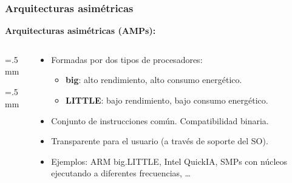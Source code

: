 \documentclass[10pt]{beamer}
\begin{document}
\begin{frame} %
  \frametitle{Arquitecturas asimétricas}
  
  {\bf Arquitecturas asimétricas (AMPs):}
  \vspace{1cm}
  \begin{columns}[onlytextwidth]
    \begin{column}{0.2\textwidth}
      \centering
      \fboxsep=2.5mm \fboxrule=.5mm
      
      
      
      
      \fboxsep=1.5mm \fboxrule=.5mm
      
      
      
    \end{column}
    
    \begin{column}{0.8\textwidth}    
      \begin{itemize}
        \small
      \item Formadas por dos tipos de procesadores:
        \begin{itemize}
          \small
        \item {\bf big}: alto rendimiento, alto consumo energético.
        \item {\bf LITTLE}: bajo rendimiento, bajo consumo energético.
        \end{itemize}
        
      \item Conjunto de instrucciones común. Compatibilidad binaria.  
      \item Transparente para el usuario (a través de soporte del SO).
      \item Ejemplos: ARM big.LITTLE, Intel QuickIA, SMPs con núcleos
        ejecutando a diferentes frecuencias, \ldots
      \end{itemize}
    \end{column}
  \end{columns} 
\end{frame}
\end{document}
